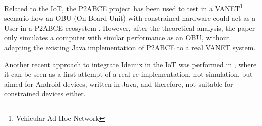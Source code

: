 Related to the IoT, the P2ABCE project has been used to test in a VANET\footnote{Vehicular Ad-Hoc Network} scenario how an OBU (On Board Unit) with constrained hardware could act as a User in a P2ABCE ecosystem \cite{vanet}. However, after the theoretical analysis, the paper only simulates a computer with similar performance as an OBU, without adapting the existing Java implementation of P2ABCE to a real VANET system.

Another recent approach to integrate Idemix in the IoT was performed in \cite{DBLP:journals/mis/BernabeRG17}, where it can be seen as a first attempt of a real re-implementation, not simulation, but aimed for Android devices, written in Java, and therefore, not suitable for constrained devices either.


